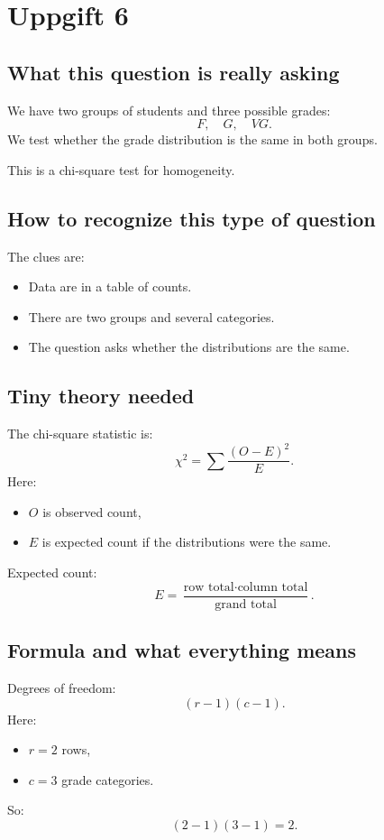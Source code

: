 \documentclass[11pt,a4paper]{article}
\begin{document}
\section*{Uppgift 6}

\subsection*{What this question is really asking}
We have two groups of students and three possible grades:
\[
F,\quad G,\quad VG.
\]
We test whether the grade distribution is the same in both groups.

This is a chi-square test for homogeneity.

\subsection*{How to recognize this type of question}
The clues are:
\begin{itemize}[leftmargin=*]
    \item Data are in a table of counts.
    \item There are two groups and several categories.
    \item The question asks whether the distributions are the same.
\end{itemize}

\subsection*{Tiny theory needed}
The chi-square statistic is:
\[
\chi^2=\sum \frac{(O-E)^2}{E}.
\]
Here:
\begin{itemize}[leftmargin=*]
    \item \(O\) is observed count,
    \item \(E\) is expected count if the distributions were the same.
\end{itemize}

Expected count:
\[
E=\frac{\text{row total}\cdot \text{column total}}{\text{grand total}}.
\]

\subsection*{Formula and what everything means}
Degrees of freedom:
\[
(r-1)(c-1).
\]
Here:
\begin{itemize}[leftmargin=*]
    \item \(r=2\) rows,
    \item \(c=3\) grade categories.
\end{itemize}
So:
\[
(2-1)(3-1)=2.
\]
\end{document}
